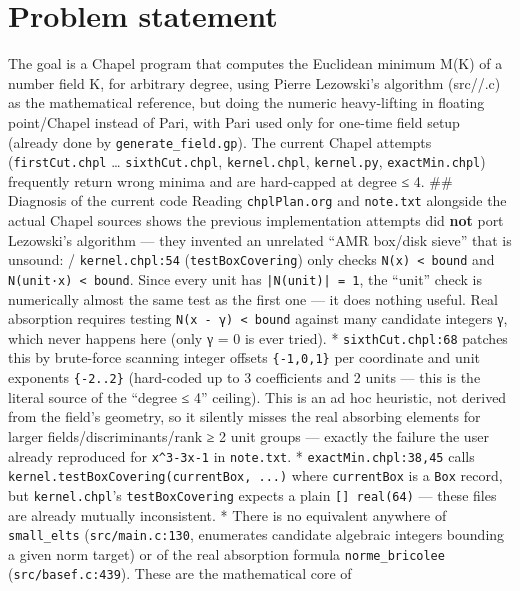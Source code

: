 \documentclass[11pt]{article}
\author{conn}
\date{\today}
\title{}
\begin{document}
\tableofcontents

\section{Problem statement}
\label{sec:org8a92bff}
The goal is a Chapel program that computes the Euclidean minimum M(K) of
a number field K, for arbitrary degree, using Pierre Lezowski's
algorithm (src//.c) as the mathematical reference, but doing the numeric
heavy-lifting in floating point/Chapel instead of Pari, with Pari used
only for one-time field setup (already done by \texttt{generate\_field.gp}). The
current Chapel attempts (\texttt{firstCut.chpl} \ldots{} \texttt{sixthCut.chpl},
\texttt{kernel.chpl}, \texttt{kernel.py}, \texttt{exactMin.chpl}) frequently return wrong
minima and are hard-capped at degree ≤ 4. \#\# Diagnosis of the current
code Reading \texttt{chplPlan.org} and \texttt{note.txt} alongside the actual Chapel
sources shows the previous implementation attempts did \textbf{not} port
Lezowski's algorithm --- they invented an unrelated “AMR box/disk sieve”
that is unsound: / \texttt{kernel.chpl:54} (\texttt{testBoxCovering}) only checks
\texttt{N(x) < bound} and \texttt{N(unit·x) < bound}. Since every unit has
\texttt{|N(unit)| = 1}, the “unit” check is numerically almost the same test as
the first one --- it does nothing useful. Real absorption requires
testing \texttt{N(x - γ) < bound} against many candidate integers γ, which
never happens here (only γ = 0 is ever tried). * \texttt{sixthCut.chpl:68}
patches this by brute-force scanning integer offsets \texttt{\{-1,0,1\}} per
coordinate and unit exponents \texttt{\{-2..2\}} (hard-coded up to 3 coefficients
and 2 units --- this is the literal source of the “degree ≤ 4” ceiling).
This is an ad hoc heuristic, not derived from the field's geometry, so
it silently misses the real absorbing elements for larger
fields/discriminants/rank ≥ 2 unit groups --- exactly the failure the
user already reproduced for \texttt{x\textasciicircum{}3-3x-1} in \texttt{note.txt}. *
\texttt{exactMin.chpl:38,45} calls \texttt{kernel.testBoxCovering(currentBox, ...)}
where \texttt{currentBox} is a \texttt{Box} record, but \texttt{kernel.chpl}'s
\texttt{testBoxCovering} expects a plain \texttt{[] real(64)} --- these files are
already mutually inconsistent. * There is no equivalent anywhere of
\texttt{small\_elts} (\texttt{src/main.c:130}, enumerates candidate algebraic integers
bounding a given norm target) or of the real absorption formula
\texttt{norme\_bricolee} (\texttt{src/basef.c:439}). These are the mathematical core of
\end{document}
